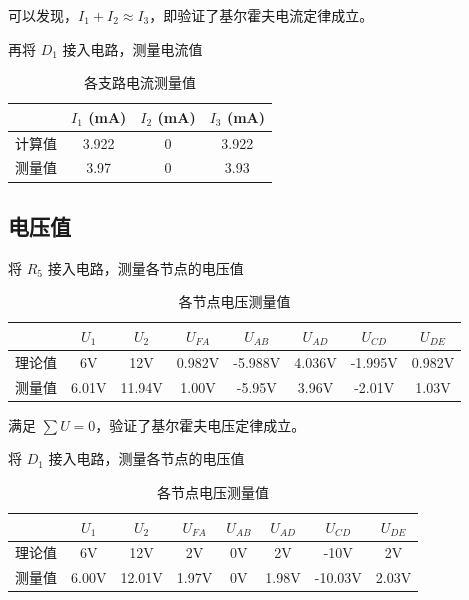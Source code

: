 \documentclass{Report} %
\begin{document}
可以发现，$I_1 + I_2 \approx I_3$，即验证了基尔霍夫电流定律成立。

\medskip %
再将 $D_1$ 接入电路，测量电流值

\begin{table}[H]
    \centering
    \caption{各支路电流测量值}
    \begin{tabular}{lccc}
        \toprule
                   & $I_1$ (mA) & $I_2$ (mA) & $I_3$ (mA) \\
        \midrule
        计算值 & 3.922      & 0          & 3.922      \\
        测量值 & 3.97       & 0          & 3.93       \\
        \bottomrule
    \end{tabular}
\end{table}

\subsection{电压值}

将 $R_5$ 接入电路，测量各节点的电压值

\begin{table}[H]
    \centering
    \caption{各节点电压测量值}
    \begin{tabular}{lccccccc}
        \toprule
                   & $U_1$  & $U_2$  & $U_{FA}$ & $U_{AB}$ & $U_{AD}$ & $U_{CD}$ & $U_{DE}$ \\
        \midrule
        理论值 & 6V     & 12V    & 0.982V   & -5.988V  & 4.036V   & -1.995V  & 0.982V   \\
        测量值 & 6.01V  & 11.94V & 1.00V    & -5.95V   & 3.96V    & -2.01V   & 1.03V    \\
        \bottomrule
    \end{tabular}
\end{table}

满足 $\sum U = 0$，验证了基尔霍夫电压定律成立。

\medskip
将 $D_1$ 接入电路，测量各节点的电压值

\begin{table}[H]
    \centering
    \caption{各节点电压测量值}
    \begin{tabular}{lccccccc}
        \toprule
                   & $U_1$  & $U_2$  & $U_{FA}$ & $U_{AB}$ & $U_{AD}$ & $U_{CD}$ & $U_{DE}$ \\
        \midrule
        理论值 & 6V     & 12V    & 2V       & 0V       & 2V       & -10V     & 2V       \\
        测量值 & 6.00V  & 12.01V & 1.97V    & 0V       & 1.98V    & -10.03V  & 2.03V    \\
        \bottomrule
    \end{tabular}
\end{table}
\end{document}
